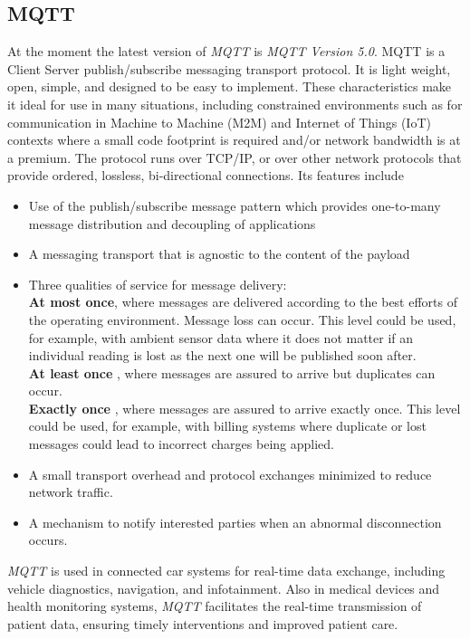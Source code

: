 \documentclass[10pt,journal,compsoc]{IEEEtran}
\begin{document}
	\subsection{\textbf{MQTT}}
	At the moment the latest version of \emph{MQTT} is \emph{MQTT Version 5.0}.\cite{mqtt} MQTT is a Client Server publish/subscribe messaging transport protocol. It is light weight, open, simple, and designed to be easy to implement. These characteristics make it ideal for use in many situations, including constrained environments such as for communication in Machine to Machine (M2M) and Internet of Things (IoT) contexts where a small code footprint is required and/or network bandwidth is at a premium.
	The protocol runs over TCP/IP, or over other network protocols that provide ordered, lossless, bi-directional connections. Its features include
	\begin{itemize}
		\item Use of the publish/subscribe message pattern which provides one-to-many message distribution and decoupling of applications
		\item A messaging transport that is agnostic to the content of the payload
		\item Three qualities of service for message delivery:\\
	     {\bfseries At most once}, where messages are delivered according to the best efforts of the operating environment. Message loss can occur. This level could be used, for example, with ambient sensor data where it does not matter if an individual reading is lost as the next one will be published soon after.\\
	      {\bfseries At least once} , where messages are assured to arrive but duplicates can occur.
		   \\{\bfseries Exactly once} , where messages are assured to arrive exactly once. This level could be used, for example, with billing systems where duplicate or lost messages could lead to incorrect charges being applied.

		\item A small transport overhead and protocol exchanges minimized to reduce network traffic.
		\item A mechanism to notify interested parties when an abnormal disconnection occurs.
	\end{itemize}\cite{mqtt}
	\emph{MQTT} is used in connected car systems for real-time data exchange, including vehicle diagnostics, navigation, and infotainment. Also in medical devices and health monitoring systems, \emph{MQTT} facilitates the real-time transmission of patient data, ensuring timely interventions and improved patient care.
\end{document}
